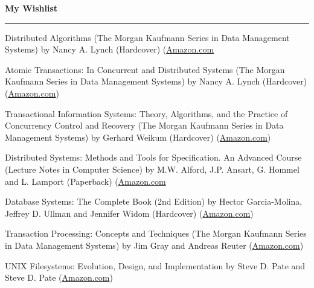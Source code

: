 \documentclass[10pt]{article}
\newcommand{\makeheading}[1]%
        {\hspace*{-\marginparsep minus \marginparwidth}%
         \begin{minipage}[t]{\textwidth+\marginparwidth+\marginparsep}%
                {\large \bfseries #1}\\[-0.15\baselineskip]%
                 \rule{\columnwidth}{1pt}%
         \end{minipage}}
\renewcommand{\section}[2]%
        {\pagebreak[2]\vspace{1.3\baselineskip}%
         \phantomsection\addcontentsline{toc}{section}{#1}%
         \hspace{0in}%
         \marginpar{
         \raggedright \scshape #1}#2}
\newenvironment{innerlist}[1][\enskip\textbullet]%
        {\begin{compactitem}[#1]}{\end{compactitem}}
\begin{document}
\makeheading {My Wishlist}

\section {Books}
	\begin{innerlist}
                \item Distributed Algorithms (The Morgan Kaufmann Series in Data Management Systems)
                  by Nancy A. Lynch (Hardcover)
                  (\href{http://www.amazon.com/Distributed-Algorithms-Kaufmann-Management-Systems/dp/1558603484}{Amazon.com}
                \item Atomic Transactions: In Concurrent and Distributed Systems (The Morgan Kaufmann Series in Data Management Systems)
                  by Nancy A. Lynch (Hardcover)
                  (\href{http://www.amazon.com/Atomic-Transactions-Concurrent-Distributed-Management/dp/155860104X}{Amazon.com})
                \item Transactional Information Systems: Theory, Algorithms, and the Practice of Concurrency Control and Recovery (The Morgan Kaufmann Series in Data Management Systems)
                  by Gerhard Weikum (Hardcover)
                  (\href{http://www.amazon.com/Transactional-Information-Systems-Algorithms-Concurrency/dp/1558605088}{Amazon.com})
                \item Distributed Systems: Methods and Tools for Specification. An Advanced Course (Lecture Notes in Computer Science)
                  by M.W. Alford, J.P. Ansart, G. Hommel and L. Lamport  (Paperback)
                  (\href{http://www.amazon.com/Distributed-Systems-Specification-Advanced-Computer/dp/3540152164}{Amazon.com}
                \item Database Systems: The Complete Book (2nd Edition)
                  by Hector Garcia-Molina, Jeffrey D. Ullman and Jennifer Widom  (Hardcover)
                  (\href{http://www.amazon.com/Database-Systems-Complete-Book-2nd/dp/0131873253}{Amazon.com})
                \item Transaction Processing: Concepts and Techniques (The Morgan Kaufmann Series in Data Management Systems)
                  by Jim Gray and Andreas Reuter
                  (\href{http://www.amazon.com/Transaction-Processing-Concepts-Techniques-Management/dp/1558601902}{Amazon.com})
                \item UNIX Filesystems: Evolution, Design, and Implementation
                  by Steve D. Pate and Steve D. Pate
                  (\href{http://www.amazon.com/UNIX-Filesystems-Evolution-Design-Implementation/dp/0471164836}{Amazon.com})

\end{innerlist}
\end{document}

